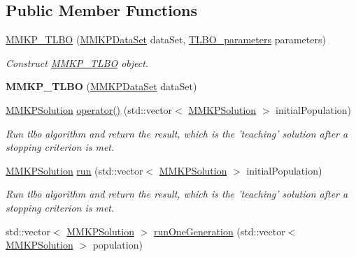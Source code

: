 \subsection*{Public Member Functions}
\begin{DoxyCompactItemize}
\item 
\hyperlink{class_m_m_k_p___t_l_b_o_a889c073268b283872a9601616bfcf6b0}{M\+M\+K\+P\+\_\+\+T\+L\+B\+O} (\hyperlink{class_m_m_k_p_data_set}{M\+M\+K\+P\+Data\+Set} data\+Set, \hyperlink{class_t_l_b_o__parameters}{T\+L\+B\+O\+\_\+parameters} parameters)
\begin{DoxyCompactList}\small\item\em Construct \hyperlink{class_m_m_k_p___t_l_b_o}{M\+M\+K\+P\+\_\+\+T\+L\+B\+O} object. \end{DoxyCompactList}\item 
\hypertarget{class_m_m_k_p___t_l_b_o_a28d6fa93504baf8e59ce23ef3168bfe3}{{\bfseries M\+M\+K\+P\+\_\+\+T\+L\+B\+O} (\hyperlink{class_m_m_k_p_data_set}{M\+M\+K\+P\+Data\+Set} data\+Set)}\label{class_m_m_k_p___t_l_b_o_a28d6fa93504baf8e59ce23ef3168bfe3}

\item 
\hypertarget{class_m_m_k_p___t_l_b_o_a095c049b8f168b34f2287a9cdbe5cd71}{\hyperlink{class_m_m_k_p_solution}{M\+M\+K\+P\+Solution} \hyperlink{class_m_m_k_p___t_l_b_o_a095c049b8f168b34f2287a9cdbe5cd71}{operator()} (std\+::vector$<$ \hyperlink{class_m_m_k_p_solution}{M\+M\+K\+P\+Solution} $>$ initial\+Population)}\label{class_m_m_k_p___t_l_b_o_a095c049b8f168b34f2287a9cdbe5cd71}

\begin{DoxyCompactList}\small\item\em Run tlbo algorithm and return the result, which is the 'teaching' solution after a stopping criterion is met. \end{DoxyCompactList}\item 
\hypertarget{class_m_m_k_p___t_l_b_o_accea97f95a12f373c6a0907804de0db8}{\hyperlink{class_m_m_k_p_solution}{M\+M\+K\+P\+Solution} \hyperlink{class_m_m_k_p___t_l_b_o_accea97f95a12f373c6a0907804de0db8}{run} (std\+::vector$<$ \hyperlink{class_m_m_k_p_solution}{M\+M\+K\+P\+Solution} $>$ initial\+Population)}\label{class_m_m_k_p___t_l_b_o_accea97f95a12f373c6a0907804de0db8}

\begin{DoxyCompactList}\small\item\em Run tlbo algorithm and return the result, which is the 'teaching' solution after a stopping criterion is met. \end{DoxyCompactList}\item 
\hypertarget{class_m_m_k_p___t_l_b_o_a4e8746954c811c2f184864dd51c4fd88}{std\+::vector$<$ \hyperlink{class_m_m_k_p_solution}{M\+M\+K\+P\+Solution} $>$ \hyperlink{class_m_m_k_p___t_l_b_o_a4e8746954c811c2f184864dd51c4fd88}{run\+One\+Generation} (std\+::vector$<$ \hyperlink{class_m_m_k_p_solution}{M\+M\+K\+P\+Solution} $>$ population)}\label{class_m_m_k_p___t_l_b_o_a4e8746954c811c2f184864dd51c4fd88}


\end{DoxyCompactItemize}
